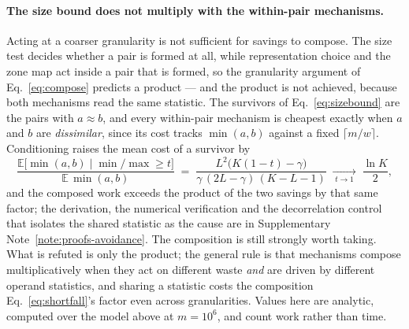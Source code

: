 \paragraph*{The size bound does not multiply with the within-pair mechanisms.}
Acting at a coarser granularity is not sufficient for savings to compose. The size test decides
whether a pair is formed at all, while representation choice and the zone map act inside a pair that
is formed, so the granularity argument of Eq.~\eqref{eq:compose} predicts a product --- and the
product is not achieved, because both mechanisms read the same statistic. The survivors of
Eq.~\eqref{eq:sizebound} are the pairs with $a\approx b$, and every within-pair mechanism is cheapest exactly
when $a$ and $b$ are \emph{dissimilar}, since its cost tracks $\min(a,b)$ against a fixed
$\lceil m/w\rceil$. Conditioning raises the mean cost of a survivor by
\begin{equation}
\frac{\mathbb{E}\big[\min(a,b)\;\big|\;\min/\max\ge t\big]}{\mathbb{E}\,\min(a,b)}
\;=\; \frac{L^{2}\big(K(1-t)-\gamma\big)}{\gamma\,(2L-\gamma)\,(K-L-1)}
\;\xrightarrow[\;t\to1\;]{}\; \frac{\ln K}{2},
\label{eq:shortfall}
\end{equation}
and the composed work exceeds the product of the two savings by that same factor; the derivation, the
numerical verification and the decorrelation control that isolates the shared statistic as the cause
are in Supplementary Note~\ref{note:proofs-avoidance}. The composition is still strongly worth taking. What is
refuted is only the product; the general rule is that mechanisms compose multiplicatively when they act
on different waste \emph{and} are driven by different operand statistics, and sharing a statistic costs
the composition Eq.~\eqref{eq:shortfall}'s factor even across granularities. Values here are analytic,
computed over the model above at $m=10^{6}$, and count work rather than time.

